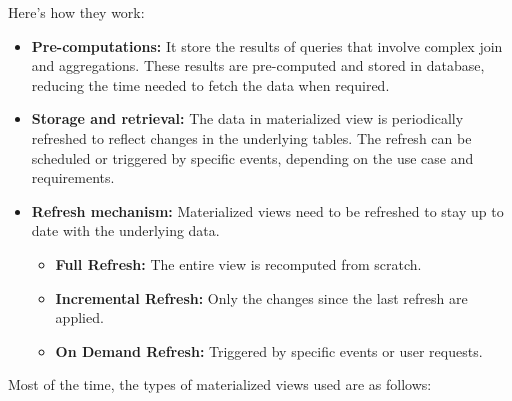 Here's how they work:
\begin{itemize}
    \item\textbf{Pre-computations:} It store the results of queries that involve complex join and aggregations. These results are pre-computed and stored in database, reducing the time needed to fetch the data when required.
    \item\textbf{Storage and retrieval:} The data in materialized view is periodically refreshed to reflect changes in the underlying tables. The refresh can be scheduled or triggered by specific events, depending on the use case and requirements.
    \item\textbf{Refresh mechanism:}  Materialized views need to be refreshed to stay up to date with the underlying data.\vspace{.4cm}

    \begin{itemize}
        \item\textbf{Full Refresh:} The entire view is recomputed from scratch.
        \item\textbf{Incremental Refresh:} Only the changes since the last refresh are applied.
        \item\textbf{On Demand Refresh:} Triggered by specific events or user requests.
    \end{itemize}
\end{itemize}\vspace{.4cm}

Most of the time, the types of materialized views used are as follows:\vspace{.4cm}

